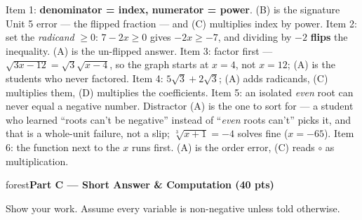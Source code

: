 \documentclass[10pt]{article}
\newcommand{\parthead}[1]{%
  \vspace{6pt}\noindent
  \begin{headlinebox}{forest}\color{white}\bfseries #1\end{headlinebox}%
  \vspace{4pt}}
\begin{document}
\begin{teachernote}
Item 1: \textbf{denominator = index, numerator = power}. (B) is the signature Unit 5 error --- the
flipped fraction --- and (C) multiplies index by power. Item 2: set the \emph{radicand}
$\ge 0$: $7-2x\ge0$ gives $-2x\ge-7$, and dividing by $-2$ \textbf{flips} the inequality. (A) is the
un-flipped answer. Item 3: factor first --- $\sqrt{3x-12}=\sqrt3\sqrt{x-4}$, so the graph starts at
$x=4$, not $x=12$; (A) is the students who never factored. Item 4: $5\sqrt3+2\sqrt3$; (A) adds
radicands, (C) multiplies them, (D) multiplies the coefficients. Item 5: an isolated \emph{even}
root can never equal a negative number. Distractor (A) is the one to sort for --- a student who
learned ``roots can't be negative'' instead of ``\emph{even} roots can't'' picks it, and that is a
whole-unit failure, not a slip; $\sqrt[3]{x+1}=-4$ solves fine ($x=-65$). Item 6: the function next
to the $x$ runs first. (A) is the order error, (C) reads $\circ$ as multiplication.
\end{teachernote}

\parthead{Part C --- Short Answer \& Computation (40 pts)}
Show your work. Assume every variable is non-negative unless told otherwise.
\end{document}
